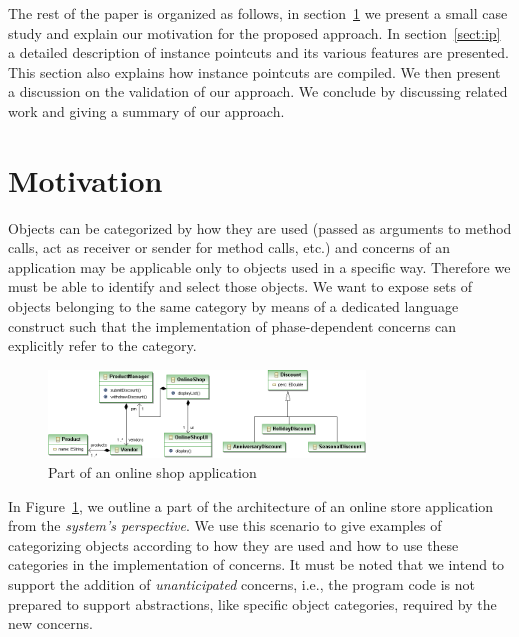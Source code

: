 The rest of the paper is organized as follows, in section~\ref{sect:motivation} we present a small case study and explain our motivation for the proposed approach. In section~\ref{sect:ip} a detailed description of instance pointcuts and its various features are presented. This section also explains how instance pointcuts are compiled. We then present a discussion on the validation of our approach. We conclude by discussing related work and giving a summary of our approach.


\section{Motivation}
\label{sect:motivation}

Objects can be categorized by how they are used (passed as arguments to method calls, act as receiver or sender for method calls, etc.) and concerns of an application may be applicable only to objects used in a specific way.
Therefore we must be able to identify and select those objects.
We want to expose sets of objects belonging to the same category by means of a dedicated language construct such that the implementation of phase-dependent concerns can explicitly refer to the category.

\begin{figure}
\centering
\includegraphics[width= 0.75\textwidth]{images/onlineshop2.png}%
\vspace{10pt}
\caption{Part of an online shop application}%
\label{fig:shop}%
\end{figure}

In Figure~\ref{fig:shop}, we outline a part of the architecture of an online store application from the \emph{system's perspective}. We use this scenario to give examples of categorizing objects according to how they are used and how to use these categories in the implementation of concerns. It must be noted that we intend to support the addition of \emph{unanticipated} concerns, i.e., the program code is not prepared to support abstractions, like specific object categories, required by the new concerns. 

